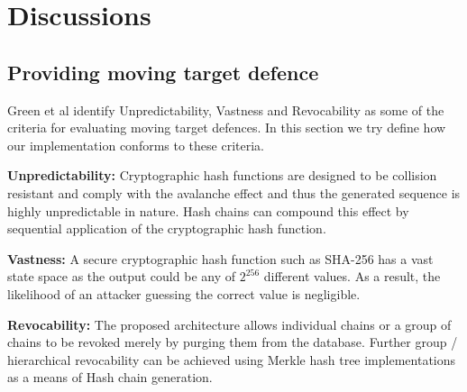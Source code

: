 \documentclass[a4paper,twoside]{article}
\begin{document}


\section{Discussions}
\label{sec:future}
\subsection{Providing moving target defence}

Green et al \cite{green_characterizing_2015} identify Unpredictability, Vastness and Revocability as some of the criteria for evaluating moving target defences. In this section we try define how our implementation conforms to these criteria.

\textbf{Unpredictability:} Cryptographic hash functions \cite{rogaway_cryptographic_2004} are designed to be collision resistant and comply with the avalanche effect and thus the generated sequence is highly unpredictable in nature. Hash chains can compound this effect by sequential application of the cryptographic hash function.

\textbf{Vastness:} A secure cryptographic hash function such as SHA-256 has a vast state space as the output could be any of $2^{256}$ different values.  As a result, the likelihood of an attacker guessing the correct value is negligible.

\textbf{Revocability:} The proposed architecture allows individual chains or a group of chains to be revoked merely by purging them from the database. Further group / hierarchical revocability can be achieved using Merkle hash tree implementations as a means of Hash chain generation.

\end{document}

